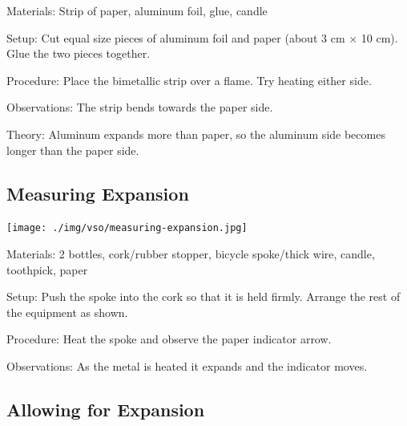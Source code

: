 \begin{multicols}{2}
\begin{description*}
\item[Materials:]{Strip of paper, aluminum foil, glue, candle}
\item[Setup:]{Cut equal size pieces of aluminum foil and paper (about 3 cm $\times$ 10 cm). Glue the two pieces together.}
\item[Procedure:]{Place the bimetallic strip over a flame. Try heating either side.}
\item[Observations:]{The strip bends towards the paper side.}
\item[Theory:]{Aluminum expands more than paper, so the aluminum side becomes longer than the paper side.}
\end{description*}

\subsection{Measuring Expansion}

\begin{center}
\texttt{[image: ./img/vso/measuring-expansion.jpg]}
\end{center}

\begin{description*}
\item[Materials:]{2 bottles, cork/rubber stopper, bicycle spoke/thick wire, candle, toothpick, paper}
\item[Setup:]{Push the spoke into the cork so that it is held firmly. Arrange the rest of the equipment as shown.}
\item[Procedure:]{Heat the spoke and observe the paper indicator arrow.}
\item[Observations:]{As the metal is heated it expands and the indicator moves.}
\end{description*}

\subsection{Allowing for Expansion}


\end{multicols}
